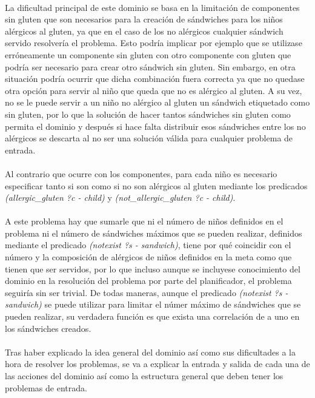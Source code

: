 \documentclass{article}
\begin{document}
\paragraph{}
La dificultad principal de este dominio se basa en la limitación de componentes
sin gluten que son necesarios para la creación de sándwiches para los niños
alérgicos al gluten, ya que en el caso de los no alérgicos cualquier sándwich
servido resolvería el problema. Esto podría implicar por ejemplo que se
utilizase erróneamente un componente sin gluten con otro componente con gluten
que podría ser necesario para crear otro sándwich sin gluten. Sin embargo, en
otra situación podría ocurrir que dicha combinación fuera correcta ya que no
quedase otra opción para servir al niño que queda que no es alérgico al gluten.
A su vez, no se le puede servir a un niño no alérgico al gluten un sándwich
etiquetado como sin gluten, por lo que la solución de hacer tantos sándwiches
sin gluten como permita el dominio y después si hace falta distribuir esos
sándwiches entre los no alérgicos se descarta al no ser una solución válida para
cualquier problema de entrada.

\paragraph{}
Al contrario que ocurre con los componentes, para cada niño es necesario
especificar tanto si son como si no son alérgicos al gluten mediante los predicados \textit{(allergic\_gluten ?c - child)} y \textit{(not\_allergic\_gluten ?c - child)}.

\paragraph{}
A este problema hay que sumarle que ni el número de niños definidos en el
problema ni el número de sándwiches máximos que se pueden realizar, definidos
mediante el predicado \textit{(notexist ?s - sandwich)}, tiene por qué coincidir
con el número y la composición de alérgicos de niños definidos en la meta como
que tienen que ser servidos, por lo que incluso aunque se incluyese conocimiento
del dominio en la resolución del problema por parte del planificador, el
problema seguiría sin ser trivial. De todas maneras, aunque el predicado \textit{(notexist ?s - sandwich)} se puede utilizar para limitar el númer máximo de sándwiches que se pueden realizar, su verdadera función es que exista una correlación de a uno en los sándwiches creados. 


\paragraph{}
Tras haber explicado la idea general del dominio así como sus dificultades a la
hora de resolver los problemas, se va a explicar la entrada y salida de cada una
de las acciones del dominio así como la estructura general que deben tener los
problemas de entrada.
\end{document}
